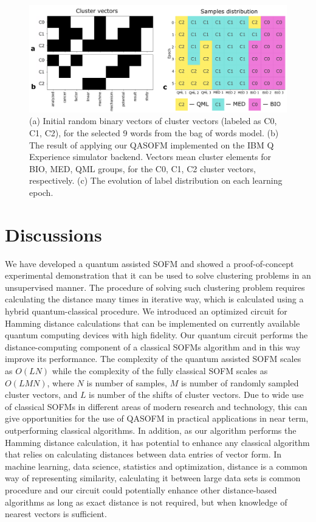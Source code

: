 \documentclass[pra,showkeys,twocolumn,showpacs]{revtex4-1}
\begin{document}
\begin{figure}[t]
	\includegraphics[width=0.95\columnwidth]{convergence.png}
	\caption{
		(a) Initial random binary vectors of cluster vectors (labeled as C0, C1, C2), 
		for the selected 9 words from the bag of words model. 
		(b) The result of applying our QASOFM implemented on the IBM Q Experience simulator backend. 
		Vectors mean cluster elements for BIO, MED, QML groups, 
		for the C0, C1, C2 cluster vectors, respectively. 
		(c) The evolution of label distribution on each learning epoch.
	} 
	\label{convergence}
\end{figure}



\section{Discussions}
We have developed a quantum assisted SOFM and showed a proof-of-concept experimental demonstration 
that it can be used to solve clustering problems in an unsupervised manner.  
The procedure of solving such clustering problem requires calculating the distance many times in iterative way, 
which is calculated using a hybrid quantum-classical procedure.  
We introduced an optimized circuit for Hamming distance calculations that can be implemented on currently available quantum computing devices with high fidelity. 
Our quantum circuit performs the distance-computing component of a classical SOFMs algorithm 
and in this way improve its performance. 
The complexity of the quantum assisted SOFM scales as $O(LN)$ 
while the complexity of the fully classical SOFM scales as $O(LMN)$, 
where $N$ is number of samples, $M$ is number of randomly sampled cluster vectors, 
and $L$ is number of the shifts of cluster vectors.
Due to wide use of classical SOFMs in different areas of modern research and technology, 
this can give opportunities for the use of QASOFM in practical applications in near term, outperforming classical algorithms. In addition, as our algorithm performs the Hamming distance calculation, it has potential to enhance any classical algorithm that relies on calculating distances between data entries of vector form. In machine learning, data science, statistics and optimization, distance is a common way of representing similarity, calculating it between large data sets is common procedure and our circuit could potentially enhance other distance-based algorithms as long as exact distance is not required, but when knowledge of nearest vectors is sufficient.
\end{document}
